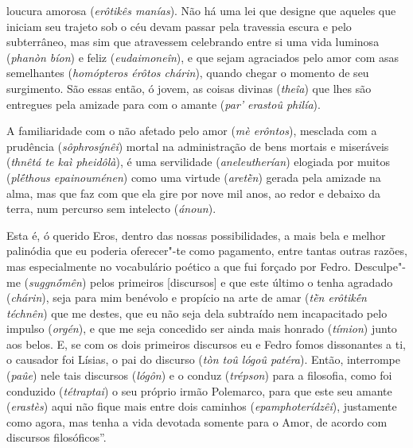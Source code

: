 loucura amorosa (\emph{erôtikês manías}). Não há uma lei que designe que
aqueles que iniciam seu trajeto sob o céu devam passar pela travessia
escura e pelo subterrâneo, mas sim que atravessem celebrando entre si
uma vida luminosa (\emph{phanòn bíon}) e feliz (\emph{eudaimoneîn}),
\bekker{[256e]} e que sejam agraciados pelo amor com asas semelhantes
(\emph{homópteros érôtos chárin}), quando chegar o momento de seu
surgimento. São essas então, ó jovem, as coisas divinas (\emph{theîa})
que lhes são entregues pela amizade para com o amante (\emph{par'
erastoû philía}).

A familiaridade com o não afetado pelo amor (\emph{mè erôntos}),
mesclada com a prudência (\emph{sôphrosýnêi}) mortal na administração de
bens mortais e miseráveis (\emph{thnêtá te kaì pheidôlà}), é uma
servilidade (\emph{aneleutherían}) elogiada por muitos (\emph{plḗthous
epainouménen}) como uma virtude (\emph{aretḕn}) gerada pela amizade na
alma, \bekker{[257a]} mas que faz com que ela gire por nove mil anos, ao
redor e debaixo da terra, num percurso sem intelecto (\emph{ánoun}).

Esta é, ó querido Eros, dentro das nossas possibilidades, a mais bela e
melhor palinódia que eu poderia oferecer"-te como pagamento, entre tantas
outras razões, mas especialmente no vocabulário poético a que fui
forçado por Fedro. Desculpe"-me (\emph{suggnṓmên}) pelos primeiros
[discursos] e que este último o tenha agradado (\emph{chárin}), seja
para mim benévolo e propício na arte de amar (\emph{tḕn erôtikḗn
téchnên}) que me destes, que eu não seja dela subtraído nem incapacitado
pelo impulso (\emph{orgén}), e que me seja concedido ser ainda mais
honrado (\emph{tímion}) junto aos belos. \bekker{[257b]} E, se com os dois
primeiros discursos eu e Fedro fomos dissonantes a ti, o causador foi
Lísias, o pai do discurso (\emph{tòn toû lógoû patéra}). Então,
interrompe (\emph{paûe}) nele tais discursos (\emph{lógôn}) e o conduz
(\emph{trépson}) para a filosofia, como foi conduzido (\emph{tétraptai})
o seu próprio irmão Polemarco, para que este seu amante (\emph{erastès})
aqui não fique mais entre dois caminhos (\emph{epamphoterídzêi}),
justamente como agora, mas tenha a vida devotada somente para o Amor, de
acordo com discursos filosóficos''.

